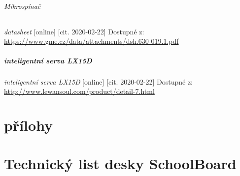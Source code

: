 \documentclass{template/socthesis}
\begin{document}
\begin{thebibliography}{1}
	\paragraph*{Mikrospínač}
	
	\textit{datasheet} [online] [cit. 2020-02-22] Dostupné z:
	\url{https://www.gme.cz/data/attachments/dsh.630-019.1.pdf}
	
	\subsubsection{inteligentní serva LX15D}
	
	\textit{inteligentní serva LX15D} [online] [cit. 2020-02-22] Dostupné z:
	\url{http://www.lewansoul.com/product/detail-7.html}
	
\end{thebibliography}

\part{přílohy}
\part*{Technický list desky SchoolBoard}
\end{document}
